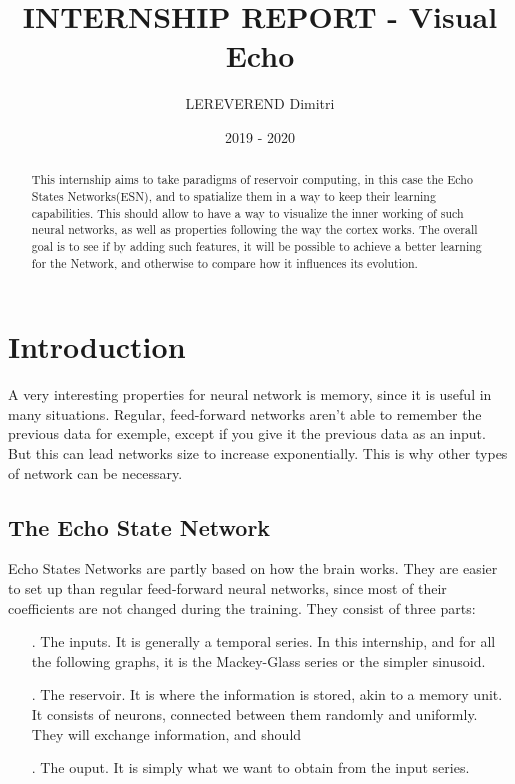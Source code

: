 \documentclass[11pt]{article}
\author{LEREVEREND Dimitri}
\date {2019 - 2020}
\title{INTERNSHIP REPORT - Visual Echo}
\begin{document}
\maketitle

\begin{abstract}
  This internship aims to take paradigms of reservoir computing, in this case the Echo States Networks(ESN), and to spatialize them in a way to keep their learning capabilities. This should allow to have a way to visualize the inner working of such neural networks, as well as properties following the way the cortex works. The overall goal is to see if by adding such features, it will be possible to achieve a better learning for the Network, and otherwise to compare how it influences its evolution.
\end{abstract}

\section{Introduction}
  A very interesting properties for neural network is memory, since it is useful in many situations. Regular, feed-forward networks aren't able to remember the previous data for exemple, except if you give it the previous data as an input. But this can lead networks size to increase exponentially. This is why other types of network can be necessary.

  \subsection{The Echo State Network}
     Echo States Networks are partly based on how the brain works. They are easier to set up than regular feed-forward neural networks, since most of their coefficients are not changed during the training. They consist of three parts:
     \begin{itemize}
       \item [.] The inputs. It is generally a temporal series. In this internship, and for all the following graphs, it is the Mackey-Glass series or the simpler sinusoid.
       \item [.] The reservoir. It is where the information is stored, akin to a memory unit. It consists of neurons, connected between them randomly and uniformly. They will exchange information, and should
       \item [.] The ouput. It is simply what we want to obtain from the input series.
     \end{itemize}
\end{document}
